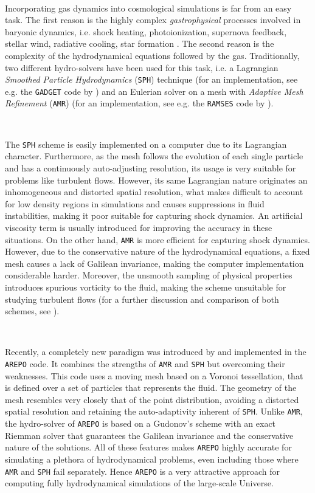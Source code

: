 \documentclass[a4,useAMS,usenatbib,usegraphicx,12pt]{article}
\begin{document}
\

Incorporating gas dynamics into cosmological simulations is far from an easy 
task. The first reason is the highly complex \textit{gastrophysical} processes 
involved in baryonic dynamics, i.e. shock heating, photoionization, supernova 
feedback, stellar wind, radiative cooling, star formation \citep{Bond93}. The
second reason is the complexity of the hydrodynamical equations followed by 
the gas. Traditionally, two different hydro-solvers have been used for this 
task, i.e. a Lagrangian \textit{Smoothed Particle Hydrodynamics} (\texttt{SPH}) 
technique \citep{Monaghan92} (for an implementation, see e.g. the \texttt{GADGET} 
code by \citet{Springel05}) and an Eulerian solver on a mesh with \textit{
Adaptive Mesh Refinement} (\texttt{AMR}) \citep{Berger89} (for an implementation, 
see e.g. the \texttt{RAMSES} code by \citet{Teyssier02}). 

\

The \texttt{SPH} scheme is easily implemented on a computer due to its 
Lagrangian character. Furthermore, as the mesh follows the evolution of each 
single particle and has a continuously auto-adjusting resolution, its usage is 
very suitable for problems like turbulent flows. However, its same Lagrangian 
nature originates an inhomogeneous and distorted spatial resolution, what makes 
difficult to account for low density regions in simulations and causes 
suppressions in fluid instabilities, making it poor suitable for capturing shock
dynamics. An artificial viscosity term is usually introduced for improving the 
accuracy in these situations. On the other hand, \texttt{AMR} is more efficient 
for capturing shock dynamics. However, due to the conservative nature of the 
hydrodynamical equations, a fixed mesh causes a lack of Galilean invariance, 
making the computer implementation considerable harder. Moreover, the 
unsmooth sampling of physical properties introduces spurious vorticity to the 
fluid, making the scheme unsuitable for studying turbulent flows (for a further
discussion and comparison of both schemes, see \citet{Plewa01}).

\

Recently, a completely new paradigm was introduced by \citet{Springel10} and 
implemented in the \texttt{AREPO} code. It combines the strengths of 
\texttt{AMR} and \texttt{SPH} but overcoming their weaknesses. This code uses 
a moving mesh based on a Voronoi tessellation, that is defined over a set of 
particles that represents the fluid. The geometry of the mesh resembles very 
closely that of the point distribution, avoiding a distorted spatial resolution 
and retaining the auto-adaptivity inherent of \texttt{SPH}. Unlike \texttt{AMR}, 
the hydro-solver of \texttt{AREPO} is based on a Gudonov's scheme with an exact 
Riemman solver that guarantees the Galilean invariance and the conservative 
nature of the solutions. All of these features makes \texttt{AREPO} highly 
accurate for simulating a plethora of hydrodynamical problems, even including 
those where \texttt{AMR} and \texttt{SPH} fail separately. Hence \texttt{AREPO} 
is a very attractive approach for computing fully hydrodynamical simulations of 
the large-scale Universe.
\end{document}
